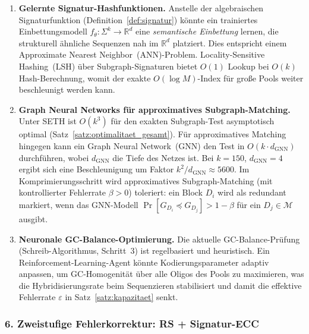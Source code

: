 ﻿\documentclass[a4paper,12pt]{article}
\theoremstyle{definition}
\begin{document}
\begin{enumerate}
    \item \textbf{Gelernte Signatur-Hashfunktionen.}
          Anstelle der algebraischen Signaturfunktion
          (Definition~\ref{def:signatur}) k\"{o}nnte ein trainiertes
          Einbettungsmodell $f_\theta: \Sigma^k \to \mathbb{R}^d$ eine
          \emph{semantische Einbettung} lernen, die strukturell
          \"{a}hnliche Sequenzen nah im $\mathbb{R}^d$ platziert.
          Dies entspricht einem Approximate Nearest Neighbor~(ANN)-Problem.
          Locality-Sensitive Hashing~(LSH) \"{u}ber Subgraph-Signaturen
          bietet $O(1)$ Lookup bei $O(k)$ Hash-Berechnung, womit der
          exakte $O(\log M)$-Index f\"{u}r gro\ss{}e Pools weiter beschleunigt
          werden kann.
    \item \textbf{Graph Neural Networks f\"{u}r approximatives Subgraph-Matching.}
          Unter SETH ist $O(k^3)$ f\"{u}r den exakten Subgraph-Test asymptotisch
          optimal (Satz~\ref{satz:optimalitaet_gesamt}).
          F\"{u}r approximatives Matching hingegen kann ein Graph Neural
          Network~(GNN) den Test in $O(k \cdot d_{\mathrm{GNN}})$ durchf\"{u}hren,
          wobei $d_{\mathrm{GNN}}$ die Tiefe des Netzes ist.
          Bei $k = 150$, $d_{\mathrm{GNN}} = 4$ ergibt sich eine Beschleunigung
          um Faktor $k^2/d_{\mathrm{GNN}} \approx 5600$.
          Im Komprimierungsschritt wird approximatives Subgraph-Matching
          (mit kontrollierter Fehlerrate $\beta > 0$) toleriert: ein Block $D_i$
          wird als redundant markiert, wenn das GNN-Modell
          $\Pr[G_{D_i} \preceq G_{D_j}] > 1 - \beta$ f\"{u}r ein
          $D_j \in \mathcal{M}$ ausgibt.
    \item \textbf{Neuronale GC-Balance-Optimierung.}
          Die aktuelle GC-Balance-Pr\"{u}fung (Schreib-Algorithmus, Schritt~3)
          ist regelbasiert und heuristisch. Ein Reinforcement-Learning-Agent
          k\"{o}nnte Kodierungsparameter adaptiv anpassen, um GC-Homogenit\"{a}t
          \"{u}ber alle Oligos des Pools zu maximieren, was die Hybridisierungsrate
          beim Sequenzieren stabilisiert und damit die effektive Fehlerrate
          $\varepsilon$ in Satz~\ref{satz:kapazitaet} senkt.
\end{enumerate}

\subsubsection*{6.\; Zweistufige Fehlerkorrektur: RS + Signatur-ECC}
\end{document}
